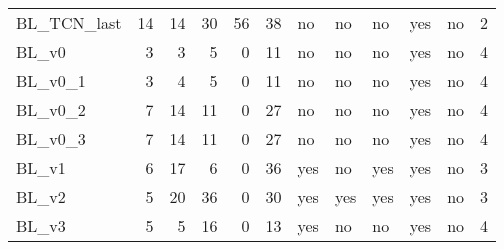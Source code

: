 \begin{tabular}{lrrrrrllllll}
BL\_TCN\_last & {\cellcolor[HTML]{79BC79}} \color[HTML]{000000} 14 & {\cellcolor[HTML]{BDDCBD}} \color[HTML]{000000} 14 & {\cellcolor[HTML]{A1CFA1}} \color[HTML]{000000} 30 & {\cellcolor[HTML]{008000}} \color[HTML]{F1F1F1} 56 & {\cellcolor[HTML]{B8DAB8}} \color[HTML]{000000} 38 & no & no & no & yes & no & 2 \\
BL\_v0 & {\cellcolor[HTML]{D3E7D3}} \color[HTML]{000000} 3 & {\cellcolor[HTML]{E1EEE1}} \color[HTML]{000000} 3 & {\cellcolor[HTML]{DFEDDF}} \color[HTML]{000000} 5 & {\cellcolor[HTML]{EBF3EB}} \color[HTML]{000000} 0 & {\cellcolor[HTML]{DCECDC}} \color[HTML]{000000} 11 & no & no & no & yes & no & 4 \\
BL\_v0\_1 & {\cellcolor[HTML]{D3E7D3}} \color[HTML]{000000} 3 & {\cellcolor[HTML]{DEEDDE}} \color[HTML]{000000} 4 & {\cellcolor[HTML]{DFEDDF}} \color[HTML]{000000} 5 & {\cellcolor[HTML]{EBF3EB}} \color[HTML]{000000} 0 & {\cellcolor[HTML]{DCECDC}} \color[HTML]{000000} 11 & no & no & no & yes & no & 4 \\
BL\_v0\_2 & {\cellcolor[HTML]{B2D7B2}} \color[HTML]{000000} 7 & {\cellcolor[HTML]{BDDCBD}} \color[HTML]{000000} 14 & {\cellcolor[HTML]{D0E6D0}} \color[HTML]{000000} 11 & {\cellcolor[HTML]{EBF3EB}} \color[HTML]{000000} 0 & {\cellcolor[HTML]{C7E1C7}} \color[HTML]{000000} 27 & no & no & no & yes & no & 4 \\
BL\_v0\_3 & {\cellcolor[HTML]{B2D7B2}} \color[HTML]{000000} 7 & {\cellcolor[HTML]{BDDCBD}} \color[HTML]{000000} 14 & {\cellcolor[HTML]{D0E6D0}} \color[HTML]{000000} 11 & {\cellcolor[HTML]{EBF3EB}} \color[HTML]{000000} 0 & {\cellcolor[HTML]{C7E1C7}} \color[HTML]{000000} 27 & no & no & no & yes & no & 4 \\
BL\_v1 & {\cellcolor[HTML]{BBDCBB}} \color[HTML]{000000} 6 & {\cellcolor[HTML]{B2D7B2}} \color[HTML]{000000} 17 & {\cellcolor[HTML]{DCECDC}} \color[HTML]{000000} 6 & {\cellcolor[HTML]{EBF3EB}} \color[HTML]{000000} 0 & {\cellcolor[HTML]{BBDCBB}} \color[HTML]{000000} 36 & yes & no & yes & yes & no & 3 \\
BL\_v2 & {\cellcolor[HTML]{C2DFC2}} \color[HTML]{000000} 5 & {\cellcolor[HTML]{A8D2A8}} \color[HTML]{000000} 20 & {\cellcolor[HTML]{92C892}} \color[HTML]{000000} 36 & {\cellcolor[HTML]{EBF3EB}} \color[HTML]{000000} 0 & {\cellcolor[HTML]{C2DFC2}} \color[HTML]{000000} 30 & yes & yes & yes & yes & no & 3 \\
BL\_v3 & {\cellcolor[HTML]{C2DFC2}} \color[HTML]{000000} 5 & {\cellcolor[HTML]{DAEBDA}} \color[HTML]{000000} 5 & {\cellcolor[HTML]{C4E0C4}} \color[HTML]{000000} 16 & {\cellcolor[HTML]{EBF3EB}} \color[HTML]{000000} 0 & {\cellcolor[HTML]{D9EAD9}} \color[HTML]{000000} 13 & yes & no & no & yes & no & 4 \\

\end{tabular}
